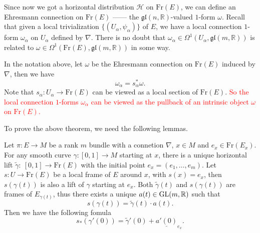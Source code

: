 Since now we got a horizontal distribution $\mathcal{H}$ on $\mathrm{Fr}(E)$, 
we can define an Ehresmann connection on $\mathrm{Fr}(E)$ ------ the $\mathfrak{gl}(n,\mathbb{R})$-valued $1$-form $\omega$. 
Recall that given a local trivialization $\{(U_\alpha, \psi_\alpha)\}$ of $E$, 
we have a local connection $1$-form $\omega_\alpha$ on $U_\alpha$ defined by $\nabla$. 
There is no doubt that $\omega_\alpha\in \Omega^1(U_\alpha, \mathfrak{gl}(m, \mathbb{R}))$ is related to 
$\omega\in \Omega^1(\mathrm{Fr}(E), \mathfrak{gl}(m, \mathbb{R}))$ in some way. 
\begin{theorem}\label{thm:local connection form is pullback of global connection form}
    In the notation above, 
    let $\omega$ be the Ehresmann connection on $\mathrm{Fr}(E)$ induced by $\nabla$, 
    then we have
    \begin{equation*}
        \omega_\alpha = s_\alpha^*\omega.
    \end{equation*}
    Note that $s_\alpha: U_\alpha\to \mathrm{Fr}(E)$ can be viewed as a local section of $\mathrm{Fr}(E)$. 
    \textcolor{red}{So the local connection $1$-forms $\omega_\alpha$ can be viewed 
    as the pullback of an intrinsic object $\omega$ on $\mathrm{Fr}(E)$.}
\end{theorem}
To prove the above theorem, we need the following lemmas.
\begin{lemma}
    Let $\pi:E\to M$ be a rank $m$ bundle with a connetion $\nabla$, $x\in M$ and $e_x\in\mathrm{Fr}(E_x)$.
    For any smooth curve $\gamma:[0,1]\to M$ starting at $x$, 
    there is a unique horizontal lift $\tilde{\gamma}:\ [0,1]\to \mathrm{Fr}(E)$ 
    with the initial point $e_x = (e_{1},\ldots,e_{m})$. 
    Let $s:U\to \mathrm{Fr}(E)$ be a local frame of $E$ around $x$, with $s(x) = e_x$, 
    then $s(\gamma(t))$ is also a lift of $\gamma$ starting at $e_x$. 
    Both $\tilde{\gamma}(t)$ and $s(\gamma(t))$ are frames of $E_{\gamma(t)}$, 
    thus there exists a unique $a(t)\in\mathrm{GL}(m,\mathbb{R})$ such that 
    \begin{equation*}
        s(\gamma(t)) = \tilde{\gamma}(t)\cdot a(t).
    \end{equation*}
    Then we have the following fomula 
    \begin{equation*}
        s_*(\gamma'(0)) = \tilde{\gamma}'(0) + \underline{a'(0)}_{e_x}.
    \end{equation*}
\end{lemma}
